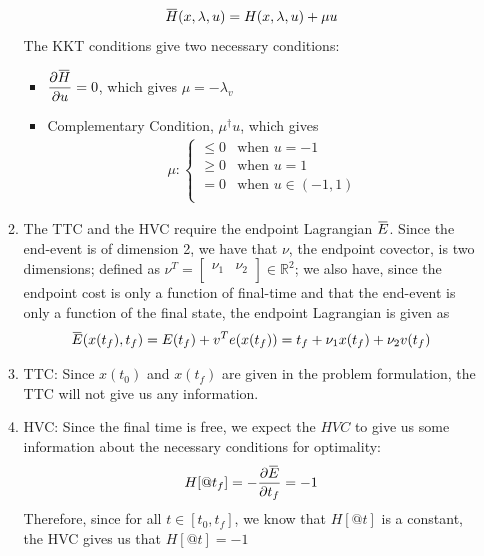 \documentclass[10pt]{article}
\newcommand{\mat}[2][ccccccccccccccc]{\left [\!\!\begin{array}{#1} #2\\ \end{array} \!\!\right]}
\newcommand{\piece}[2][cll]{\left \{\begin{array}{#1} #2\\ \end{array} \right. }
\newcommand{\libzptrl}[2]{\dfrac{\partial #1}{\partial #2} }
\newcommand{\overbar}[1]{\mkern 1.5mu\overline{\mkern-1.5mu#1\mkern-1.5mu}\mkern 1.5mu}
\newcommand{\bbr}{\mathbb{R}}
\begin{document}
\begin{enumerate}[leftmargin=*]
\begin{enumerate}[label=\roman*]
\begin{align*}
                    \overbar H(x,\lambda,u) = H(x, \lambda, u) + \mu u
                  \end{align*}
                  The KKT conditions give two necessary conditions:
                  \begin{itemize}
                    \item $\libzptrl{\overbar H}{u} = 0$, which gives $\mu = -\lambda_v$
                    \item Complementary Condition, $\mu^\dagger u$, which gives
                            \begin{align*}
                                \mu : \piece{ \le0 & \text{when $u =-1$} \\
                                              \ge0 & \text{when $u = 1$} \\
                                              =0   & \text{when $u\in(-1,1)$} }
                            \end{align*}
                  \end{itemize}

        \item[] The TTC and the HVC require the endpoint Lagrangian $\overbar E$. Since the end-event is of dimension 2, we have that $\nu$, the endpoint covector, is two dimensions; defined as  $\nu^T = \mat{\nu_1 & \nu_2}\in\bbr^2$; we also have, since the endpoint cost is only a function of final-time and that the end-event is only a function of the final state, the endpoint Lagrangian is given as
                \begin{align*}
                    \overbar E(x(t_f), t_f) = E(t_f) + v^Te(x(t_f)) = t_f + \nu_1x(t_f) + \nu_2v(t_f)
                \end{align*}
        \item TTC: Since $x(t_0)$ and $x(t_f)$ are given in the problem formulation, the TTC will not give us any information.
        \item HVC:  Since the final time is free, we expect the $HVC$ to give us some information about the necessary conditions for optimality:
            \begin{align*}
                H[@t_f] = -\libzptrl{\overbar E}{t_f} = -1
            \end{align*}
            Therefore, since for all $t\in[t_0,t_f]$, we know that $H[@t]$ is a constant, the HVC gives us that $H[@t]=-1$
      \end{enumerate}



\end{enumerate}
\end{document}
